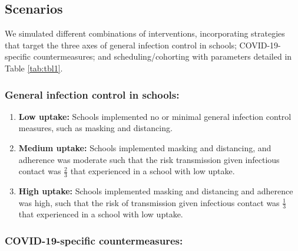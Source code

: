 \documentclass[
]{article}
\providecommand{\tightlist}{%
  \setlength{\itemsep}{0pt}\setlength{\parskip}{0pt}}
\begin{document}
\hypertarget{scenarios}{%
\subsection{Scenarios}\label{scenarios}}

We simulated different combinations of interventions, incorporating
strategies that target the three axes of general infection control in
schools; COVID-19-specific countermeasures; and scheduling/cohorting
with parameters detailed in Table \ref{tab:tbl1}.

\medskip

\hypertarget{general-infection-control-in-schools}{%
\subsubsection{General infection control in
schools:}\label{general-infection-control-in-schools}}

\begin{enumerate}
\def\labelenumi{\arabic{enumi}.}
\tightlist
\item
  \textbf{Low uptake:} Schools implemented no or minimal general
  infection control measures, such as masking and distancing.
\item
  \textbf{Medium uptake:} Schools implemented masking and distancing,
  and adherence was moderate such that the risk transmission given
  infectious contact was \(\frac{2}{3}\) that experienced in a school
  with low uptake.
\item
  \textbf{High uptake:} Schools implemented masking and distancing and
  adherence was high, such that the risk of transmission given
  infectious contact was \(\frac{1}{3}\) that experienced in a school
  with low uptake.
\end{enumerate}

\medskip

\hypertarget{covid-19-specific-countermeasures}{%
\subsubsection{COVID-19-specific
countermeasures:}\label{covid-19-specific-countermeasures}}
\end{document}
